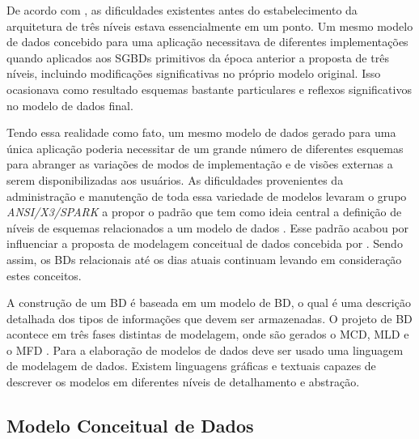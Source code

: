 De acordo com , as dificuldades existentes antes do estabelecimento da arquitetura de três níveis estava essencialmente em um ponto. 
Um mesmo modelo de dados concebido para uma aplicação necessitava de diferentes implementações quando aplicados aos \acp{SGBD} primitivos da época anterior a proposta de três níveis, incluindo modificações significativas no próprio modelo original. 
Isso ocasionava como resultado esquemas bastante particulares e reflexos significativos no modelo de dados final.

Tendo essa realidade como fato, um mesmo modelo de dados gerado para uma única aplicação poderia necessitar de um grande número de diferentes esquemas para abranger as variações de modos de implementação e de visões externas a serem disponibilizadas aos usuários. 
As dificuldades provenientes da administração e manutenção de toda essa variedade de modelos levaram o grupo \textit{ANSI/X3/SPARK} a propor o padrão que tem como ideia central a definição de níveis de esquemas relacionados a um modelo de dados \cite{Cougo:2013}.
Esse padrão acabou por influenciar a proposta de modelagem conceitual de dados concebida por . 
Sendo assim, os \acp{BD} relacionais até os dias atuais continuam levando em consideração estes conceitos. 

A construção de um \ac{BD} é baseada em um modelo de \ac{BD}, o qual é uma descrição detalhada dos tipos de informações que devem ser armazenadas. 
O projeto de \ac{BD} acontece em três fases distintas de modelagem, onde são gerados o \ac{MCD}, \ac{MLD} e o \ac{MFD} \cite{Heuser:2009}. 
Para a elaboração de modelos de dados deve ser usado uma linguagem de modelagem de dados. 
Existem linguagens gráficas e textuais capazes de descrever os modelos em diferentes níveis de detalhamento e abstração.  


\subsection{Modelo Conceitual de Dados} \label{ssec:ModelConceitual}

